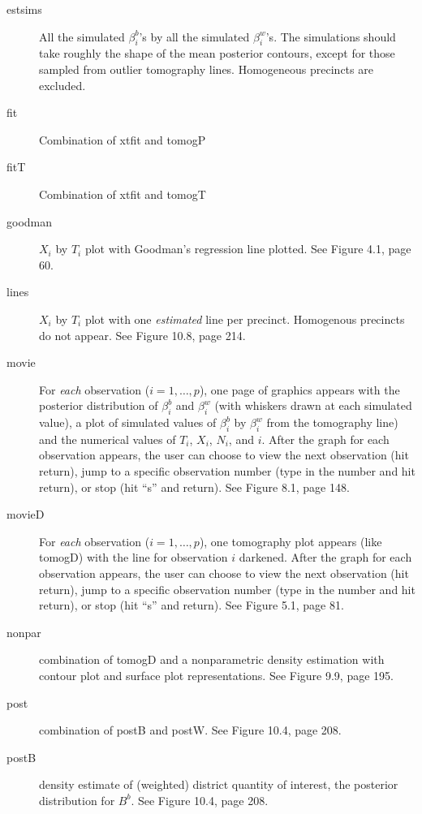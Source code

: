 \documentclass[11pt,titlepage]{article}
\begin{document}
\begin{description}
\item[estsims] All the simulated $\beta_i^b$'s by all the simulated
  $\beta_i^w$'s.  The simulations should take roughly the shape of the
  mean posterior contours, except for those sampled from outlier
  tomography lines. Homogeneous precincts are excluded.

\item[fit] Combination of xtfit and tomogP

\item[fitT] Combination of xtfit and tomogT

\item[goodman] $X_i$ by $T_i$ plot with Goodman's regression line
  plotted. See Figure 4.1, page 60.

\item[lines] $X_i$ by $T_i$ plot with one \emph{estimated} line per
  precinct.  Homogenous precincts do not appear.  See Figure 10.8, page 214.

\item[movie] For \emph{each} observation ($i=1,\ldots,p$), one page of
  graphics appears with the posterior distribution of $\beta_i^b$ and
  $\beta_i^w$ (with whiskers drawn at each simulated value), a plot of
  simulated values of $\beta_i^b$ by $\beta_i^w$ from the tomography
  line) and the numerical values of $T_i$, $X_i$, $N_i$, and $i$.
  After the graph for each observation appears, the user can choose to
  view the next observation (hit return), jump to a specific
  observation number (type in the number and hit return), or stop (hit
  ``s'' and return).  See Figure 8.1, page 148.

\item[movieD] For \emph{each} observation ($i=1,\ldots,p$), one
  tomography plot appears (like tomogD) with the line for observation
  $i$ darkened.  After the graph for each observation appears, the
  user can choose to view the next observation (hit return), jump to a
  specific observation number (type in the number and hit return), or
  stop (hit ``s'' and return).  See Figure 5.1, page 81.

\item[nonpar] combination of tomogD and a nonparametric density
  estimation with contour plot and surface plot representations.  See
  Figure 9.9, page 195.

\item[post] combination of postB and postW.  See Figure
  10.4, page 208.

\item[postB] density estimate of (weighted) district quantity of
  interest, the posterior distribution for $B^b$.  See Figure
  10.4, page 208.


\end{description}
\end{document}
